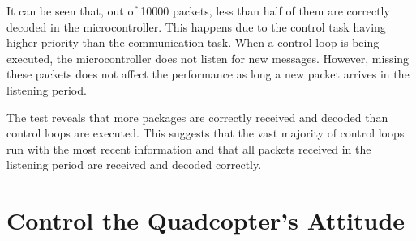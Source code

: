 It can be seen that, out of 10000 packets, less than half of them are correctly decoded in the microcontroller. This happens due to the control task having higher priority than the communication task. When a control loop is being executed, the microcontroller does not listen for new messages. However, missing these packets does not affect the performance as long a new packet arrives in the listening period.

The test reveals that more packages are correctly received and decoded than control loops are executed. This suggests that the vast majority of control loops run with the most recent information and that all packets received in the listening period are received and decoded correctly. 
\section{Control the Quadcopter's Attitude} \label{sec:accepttestAttitude}



